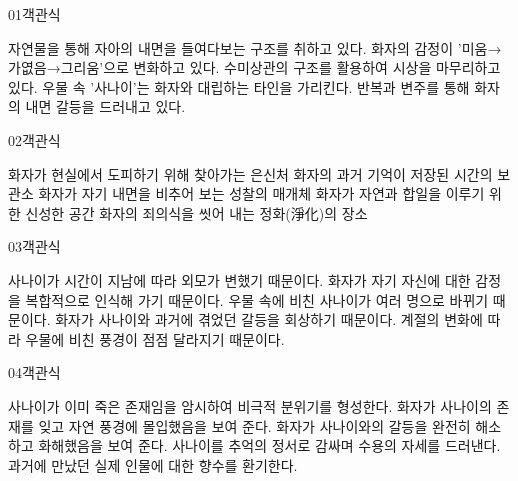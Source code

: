 \documentclass[fs85,seriesWit]{korfarm-base}
\begin{document}
\kfBeginMC
\begin{kfQBlock}{01}{객관식}
\begin{kfChoices}
\kfChoice 자연물을 통해 자아의 내면을 들여다보는 구조를 취하고 있다.
\kfChoice 화자의 감정이 '미움→가엾음→그리움'으로 변화하고 있다.
\kfChoice 수미상관의 구조를 활용하여 시상을 마무리하고 있다.
\kfChoice 우물 속 '사나이'는 화자와 대립하는 타인을 가리킨다.
\kfChoice 반복과 변주를 통해 화자의 내면 갈등을 드러내고 있다.
\end{kfChoices}
\end{kfQBlock}

\begin{kfQBlock}{02}{객관식}
\begin{kfChoices}
\kfChoice 화자가 현실에서 도피하기 위해 찾아가는 은신처
\kfChoice 화자의 과거 기억이 저장된 시간의 보관소
\kfChoice 화자가 자기 내면을 비추어 보는 성찰의 매개체
\kfChoice 화자가 자연과 합일을 이루기 위한 신성한 공간
\kfChoice 화자의 죄의식을 씻어 내는 정화(淨化)의 장소
\end{kfChoices}
\end{kfQBlock}

\begin{kfQBlock}{03}{객관식}
\begin{kfChoices}
\kfChoice 사나이가 시간이 지남에 따라 외모가 변했기 때문이다.
\kfChoice 화자가 자기 자신에 대한 감정을 복합적으로 인식해 가기 때문이다.
\kfChoice 우물 속에 비친 사나이가 여러 명으로 바뀌기 때문이다.
\kfChoice 화자가 사나이와 과거에 겪었던 갈등을 회상하기 때문이다.
\kfChoice 계절의 변화에 따라 우물에 비친 풍경이 점점 달라지기 때문이다.
\end{kfChoices}
\end{kfQBlock}

\begin{kfQBlock}{04}{객관식}
\begin{kfChoices}
\kfChoice 사나이가 이미 죽은 존재임을 암시하여 비극적 분위기를 형성한다.
\kfChoice 화자가 사나이의 존재를 잊고 자연 풍경에 몰입했음을 보여 준다.
\kfChoice 화자가 사나이와의 갈등을 완전히 해소하고 화해했음을 보여 준다.
\kfChoice 사나이를 추억의 정서로 감싸며 수용의 자세를 드러낸다.
\kfChoice 과거에 만났던 실제 인물에 대한 향수를 환기한다.
\end{kfChoices}
\end{kfQBlock}
\end{document}
